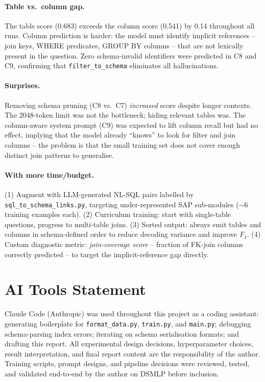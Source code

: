 \documentclass[11pt]{article}
\begin{document}
\paragraph{Table vs.\ column gap.}
The table score (0.683) exceeds the column score (0.541) by 0.14 throughout all runs.
Column prediction is harder: the model must identify implicit references -- join keys,
WHERE predicates, GROUP BY columns -- that are not lexically present in the question.
Zero schema-invalid identifiers were predicted in C8 and C9, confirming that
\texttt{filter\_to\_schema} eliminates all hallucinations.

\paragraph{Surprises.}
Removing schema pruning (C8 vs.\ C7) \emph{increased} score despite longer contexts.
The 2048-token limit was not the bottleneck; hiding relevant tables was.
The column-aware system prompt (C9) was expected to lift column recall but had no effect,
implying that the model already ``knows'' to look for filter and join columns -- the problem
is that the small training set does not cover enough distinct join patterns to generalise.

\paragraph{With more time/budget.}
(1) Augment with LLM-generated NL-SQL pairs labelled by \texttt{sql\_to\_schema\_links.py},
targeting under-represented SAP sub-modules ($\sim$6 training examples each).
(2) Curriculum training: start with single-table questions, progress to multi-table joins.
(3) Sorted output: always emit tables and columns in schema-defined order to reduce
decoding variance and improve $F_1$.
(4) Custom diagnostic metric: \textit{join-coverage score} -- fraction of FK-join columns
correctly predicted -- to target the implicit-reference gap directly.

\section{AI Tools Statement}

Claude Code (Anthropic) was used throughout this project as a coding assistant: generating
boilerplate for \texttt{format\_data.py}, \texttt{train.py}, and \texttt{main.py};
debugging schema-parsing index errors; iterating on schema serialisation formats; and
drafting this report. All experimental design decisions, hyperparameter choices, result
interpretation, and final report content are the responsibility of the author.
Training scripts, prompt designs, and pipeline decisions were reviewed, tested, and
validated end-to-end by the author on DSMLP before inclusion.
\end{document}
